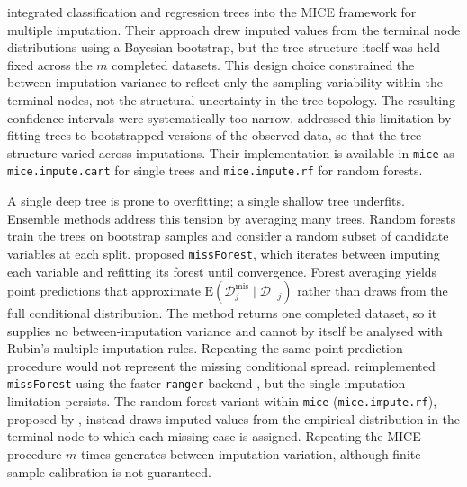 \citet{burgette2010multiple} integrated classification and regression trees into the MICE framework for multiple imputation. Their approach drew imputed values from the terminal node distributions using a Bayesian bootstrap, but the tree structure itself was held fixed across the $m$ completed datasets. This design choice constrained the between-imputation variance to reflect only the sampling variability within the terminal nodes, not the structural uncertainty in the tree topology. The resulting confidence intervals were systematically too narrow. \citet{doove2014recursive} addressed this limitation by fitting trees to bootstrapped versions of the observed data, so that the tree structure varied across imputations. Their implementation is available in \texttt{mice} as \texttt{mice.impute.cart} for single trees and \texttt{mice.impute.rf} for random forests.

A single deep tree is prone to overfitting; a single shallow tree underfits. Ensemble methods address this tension by averaging many trees. Random forests \citep{breiman2001random} train the trees on bootstrap samples and consider a random subset of candidate variables at each split. \citet{stekhoven2012missforest} proposed \texttt{missForest}, which iterates between imputing each variable and refitting its forest until convergence. Forest averaging yields point predictions that approximate $\mathrm{E}(\mathcal{D}_j^{\mathrm{mis}} \mid \mathcal{D}_{-j})$ rather than draws from the full conditional distribution. The method returns one completed dataset, so it supplies no between-imputation variance and cannot by itself be analysed with Rubin's multiple-imputation rules. Repeating the same point-prediction procedure would not represent the missing conditional spread. \citet{mayer2019package} reimplemented \texttt{missForest} using the faster \texttt{ranger} backend \citep{wright2017ranger}, but the single-imputation limitation persists. The random forest variant within \texttt{mice} (\texttt{mice.impute.rf}), proposed by \citet{doove2014recursive}, instead draws imputed values from the empirical distribution in the terminal node to which each missing case is assigned. Repeating the MICE procedure $m$ times generates between-imputation variation, although finite-sample calibration is not guaranteed.

